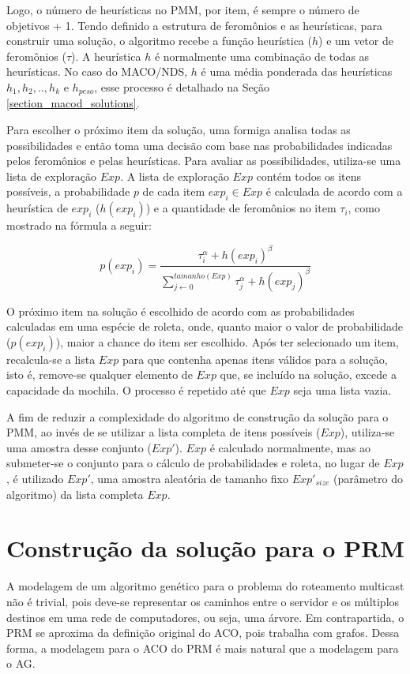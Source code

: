Logo, o número de heurísticas no PMM, por item, é sempre o número de objetivos + 1. Tendo definido a estrutura de feromônios e as heurísticas, para construir uma solução, o algoritmo recebe a função heurística ($h$) e um vetor de feromônios ($\tau$). A heurística $h$ é normalmente uma combinação de todas as heurísticas. No caso do MACO/NDS, $h$ é uma média ponderada das heurísticas $h_1, h_2, .., h_k$ e $h_{peso}$, esse processo é detalhado na Seção \ref{section_macod_solutions}.

Para escolher o próximo item da solução, uma formiga analisa todas as possibilidades e então toma uma decisão com base nas probabilidades indicadas pelos feromônios e pelas heurísticas. Para avaliar as possibilidades, utiliza-se uma lista de exploração $Exp$. A lista de exploração $Exp$ contém todos os itens possíveis, a probabilidade $p$ de cada item $exp_i \in Exp$ é calculada de acordo com a heurística de $exp_i$ ($h(exp_i)$) e a quantidade de feromônios no item $\tau_i$, como mostrado na fórmula a seguir:

\[p(exp_i) = \frac{\tau_i^\alpha + h(exp_i)^\beta}{\sum_{j \gets 0}^{tamanho(Exp)} \tau_j^\alpha + h(exp_j)^\beta}\]

O próximo item na solução é escolhido de acordo com as probabilidades calculadas em uma espécie de roleta, onde, quanto maior o valor de probabilidade ($p(exp_i)$), maior a chance do item ser escolhido. Após ter selecionado um item, recalcula-se a lista $Exp$ para que contenha apenas itens válidos para a solução, isto é, remove-se qualquer elemento de $Exp$ que, se incluído na solução, excede a capacidade da mochila. O processo é repetido até que $Exp$ seja uma lista vazia.

A fim de reduzir a complexidade do algoritmo de construção da solução para o PMM, ao invés de se utilizar a lista completa de itens possíveis ($Exp$), utiliza-se uma amostra desse conjunto ($Exp'$). $Exp$ é calculado normalmente, mas ao submeter-se o conjunto para o cálculo de probabilidades e roleta, no lugar de $Exp$, é utilizado $Exp'$, uma amostra aleatória de tamanho fixo $Exp'_{size}$ (parâmetro do algoritmo) da lista completa $Exp$.

\section{Construção da solução para o PRM}
\label{section_algoritmo_prm}

A modelagem de um algoritmo genético para o problema do roteamento multicast não é trivial, pois deve-se representar os caminhos entre o servidor e os múltiplos destinos em uma rede de computadores, ou seja, uma árvore. Em contrapartida, o PRM se aproxima da definição original do ACO, pois trabalha com grafos. Dessa forma, a modelagem para o ACO do PRM é mais natural que a modelagem para o AG.

